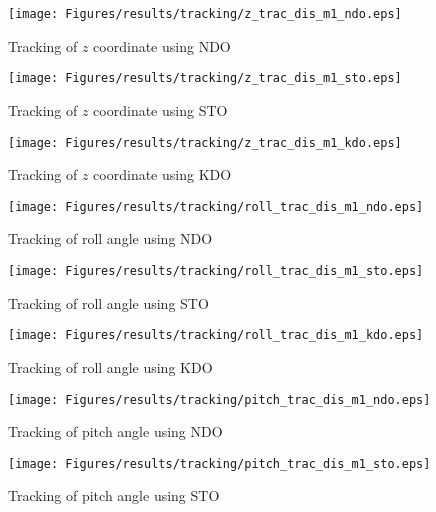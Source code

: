 \documentclass{article}
\begin{document}
\begin{figure}[H]
\centering
\texttt{[image: Figures/results/tracking/z\_trac\_dis\_m1\_ndo.eps]}
\caption{Tracking of $z$ coordinate using NDO}
\label{z_trac_dis_m1_ndo}
\end{figure}

\begin{figure}[H]
\centering
\texttt{[image: Figures/results/tracking/z\_trac\_dis\_m1\_sto.eps]}
\caption{Tracking of $z$ coordinate using STO}
\label{z_trac_dis_m1_sto}
\end{figure}

\begin{figure}[H]
\centering
\texttt{[image: Figures/results/tracking/z\_trac\_dis\_m1\_kdo.eps]}
\caption{Tracking of $z$ coordinate using KDO}
\label{z_trac_dis_m1_kdo}
\end{figure}

\begin{figure}[H]
\centering
\texttt{[image: Figures/results/tracking/roll\_trac\_dis\_m1\_ndo.eps]}
\caption{Tracking of roll angle using NDO}
\label{roll_trac_dis_m1_ndo}
\end{figure}

\begin{figure}[H]
\centering
\texttt{[image: Figures/results/tracking/roll\_trac\_dis\_m1\_sto.eps]}
\caption{Tracking of roll angle using STO}
\label{roll_trac_dis_m1_sto}
\end{figure}

\begin{figure}[H]
\centering
\texttt{[image: Figures/results/tracking/roll\_trac\_dis\_m1\_kdo.eps]}
\caption{Tracking of roll angle using KDO}
\label{roll_trac_dis_m1_kdo}
\end{figure}

\begin{figure}[H]
\centering
\texttt{[image: Figures/results/tracking/pitch\_trac\_dis\_m1\_ndo.eps]}
\caption{Tracking of pitch angle using NDO}
\label{pitch_trac_dis_m1_ndo}
\end{figure}

\begin{figure}[H]
\centering
\texttt{[image: Figures/results/tracking/pitch\_trac\_dis\_m1\_sto.eps]}
\caption{Tracking of pitch angle using STO}
\label{pitch_trac_dis_m1_sto}
\end{figure}
\end{document}
